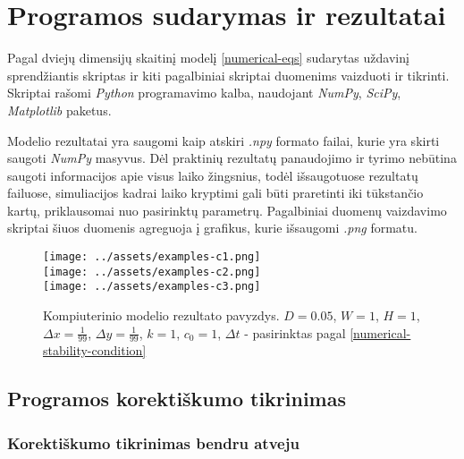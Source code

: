 \section{Programos sudarymas ir rezultatai}

Pagal dviejų dimensijų skaitinį modelį \eqref{numerical-eqs} sudarytas uždavinį sprendžiantis skriptas ir kiti pagalbiniai skriptai duomenims vaizduoti ir tikrinti. Skriptai rašomi \textit{Python} programavimo kalba, naudojant \textit{NumPy}, \textit{SciPy}, \textit{Matplotlib} paketus. 

Modelio rezultatai yra saugomi kaip atskiri \textit{.npy} formato failai, kurie yra skirti saugoti \mbox{\textit{NumPy}} masyvus. Dėl praktinių rezultatų panaudojimo ir tyrimo nebūtina saugoti informacijos apie visus laiko žingsnius, todėl išsaugotuose rezultatų failuose, simuliacijos kadrai laiko kryptimi gali būti praretinti iki tūkstančio kartų, priklausomai nuo pasirinktų parametrų. Pagalbiniai duomenų vaizdavimo skriptai šiuos duomenis agreguoja į grafikus, kurie išsaugomi \textit{.png} formatu.

\begin{figure}[h!]
\centering
\caption{Kompiuterinio modelio rezultato pavyzdys. $D = 0.05$, $W = 1$, $H = 1$, $\Delta x = \frac{1}{99}$, $\Delta y = \frac{1}{99}$, $k = 1$, $c_0 = 1$, $\Delta t$ - pasirinktas pagal \eqref{numerical-stability-condition} }
\texttt{[image: ../assets/examples-c1.png]} \\
\texttt{[image: ../assets/examples-c2.png]} \\
\texttt{[image: ../assets/examples-c3.png]}
\label{result-example}
\end{figure}

\newpage
\subsection{Programos korektiškumo tikrinimas}

\subsubsection*{Korektiškumo tikrinimas bendru atveju}


